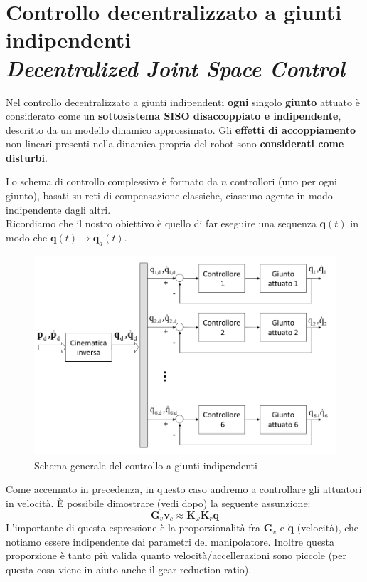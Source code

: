 \section{Controllo decentralizzato a giunti indipendenti \\ {\small \textit{Decentralized Joint Space Control}}}

Nel controllo decentralizzato a giunti indipendenti \textbf{ogni} singolo \textbf{giunto} attuato è considerato come un \textbf{sottosistema SISO disaccoppiato e indipendente}, descritto da un modello dinamico approssimato. Gli \textbf{effetti di accoppiamento} non-lineari presenti nella dinamica propria del robot sono \textbf{considerati come disturbi}.

Lo schema di controllo complessivo è formato da $n$ controllori (uno per ogni giunto), basati su reti di compensazione classiche, ciascuno agente in modo indipendente dagli altri.\\
Ricordiamo che il nostro obiettivo è quello di far eseguire una sequenza $\mathbf{q}(t)$ in modo che $\mathbf{q}(t) \to \mathbf{q}_d(t)$.\\	


\begin{figure}[th!]
	\centering
	\includegraphics[width=0.7\linewidth]{images/decentralized_joint_space_control_1}
	\caption{Schema generale del controllo a giunti indipendenti}
	\label{fig:decentralizedjointspacecontrol1}
\end{figure}


Come accennato in precedenza, in questo caso andremo a controllare gli attuatori in velocità. È possibile dimostrare (vedi dopo) la seguente assunzione:
$$
\mathbf{G}_v\mathbf{v}_c \approx \mathbf{K}_\omega\mathbf{K}_r\mathbf{\dot{q}}
$$
L'importante di questa espressione è la proporzionalità fra $\mathbf{G}_v$ e  $\dot{\mathbf{q}}$ (velocità), che notiamo essere indipendente dai parametri del manipolatore. Inoltre questa proporzione è tanto più valida quanto velocità/accellerazioni sono piccole (per questa cosa viene in aiuto anche il gear-reduction ratio).


